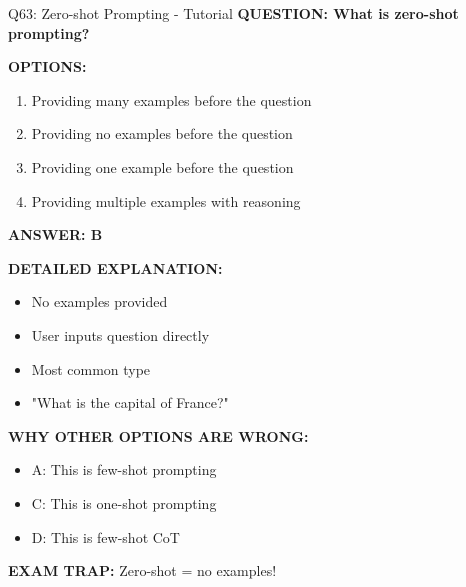 \documentclass[8pt]{beamer}
\begin{document}
	\begin{frame}{Q63: Zero-shot Prompting - Tutorial}
		\fontsize{6.5}{7.5}\selectfont
		\textbf{QUESTION: What is zero-shot prompting?}
		
		\vspace{0.1cm}
		\textbf{OPTIONS:}
		\begin{enumerate}
			\item Providing many examples before the question
			\item Providing no examples before the question
			\item Providing one example before the question
			\item Providing multiple examples with reasoning
		\end{enumerate}
		
		\vspace{0.1cm}
		\textcolor{myblue}{\textbf{ANSWER: B}}
		
		\vspace{0.1cm}
		\textbf{DETAILED EXPLANATION:}
		\begin{itemize}
			\item No examples provided
			\item User inputs question directly
			\item Most common type
			\item "What is the capital of France?"
		\end{itemize}
		
		\vspace{0.1cm}
		\textcolor{myred}{\textbf{WHY OTHER OPTIONS ARE WRONG:}}
		\begin{itemize}
			\item \textcolor{myred}{A:} This is few-shot prompting
			\item \textcolor{myred}{C:} This is one-shot prompting
			\item \textcolor{myred}{D:} This is few-shot CoT
		\end{itemize}
		
		\textcolor{myred}{\textbf{EXAM TRAP:}} Zero-shot = \textcolor{myblue}{no examples}!
	\end{frame}
	
\end{document}
